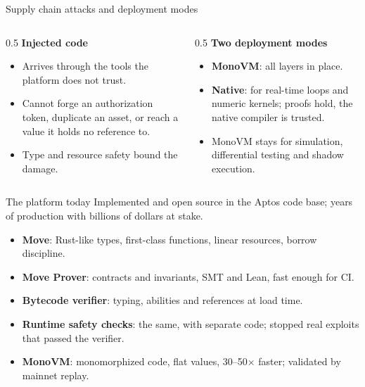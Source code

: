 \documentclass[aspectratio=169,11pt]{beamer}
\begin{document}
\begin{frame}{Supply chain attacks and deployment modes}
  \begin{columns}[T]
    \begin{column}{0.5\textwidth}
      \textbf{Injected code}
      \begin{itemize}\setlength{\itemsep}{4pt}
        \item Arrives through the tools the platform does not trust.
        \item Cannot forge an authorization token, duplicate an asset, or reach a value it holds no reference to.
        \item Type and resource safety bound the damage.
      \end{itemize}
    \end{column}
    \begin{column}{0.5\textwidth}
      \textbf{Two deployment modes}
      \begin{itemize}\setlength{\itemsep}{4pt}
        \item \textbf{MonoVM}: all layers in place.
        \item \textbf{Native}: for real-time loops and numeric kernels; proofs hold, the native compiler is trusted.
        \item MonoVM stays for simulation, differential testing and shadow execution.
      \end{itemize}
    \end{column}
  \end{columns}
\end{frame}

\begin{frame}{The platform today}
  Implemented and open source in the Aptos code base; years of production with billions of dollars at stake.
  \medskip
  \begin{itemize}\setlength{\itemsep}{4pt}
    \item \textbf{Move}: Rust-like types, first-class functions, linear resources, borrow discipline.
    \item \textbf{Move Prover}: contracts and invariants, SMT and Lean, fast enough for CI.
    \item \textbf{Bytecode verifier}: typing, abilities and references at load time.
    \item \textbf{Runtime safety checks}: the same, with separate code; stopped real exploits that passed the verifier.
    \item \textbf{MonoVM}: monomorphized code, flat values, 30--50$\times$ faster; validated by mainnet replay.
  \end{itemize}
\end{frame}
\end{document}
